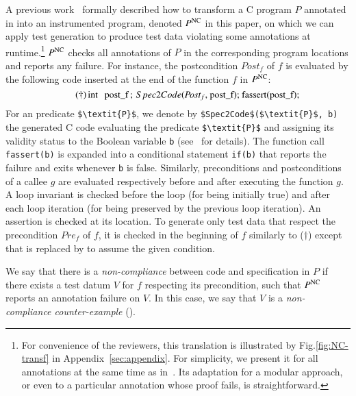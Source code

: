 A previous work~\cite{Petiot/SCAM14} formally described 
how to transform a C program $P$ annotated in \eacsl
into an instrumented program, denoted  $P^\mathrm{NC}$ in this paper,
on which we can apply test generation to produce test data
violating some annotations at runtime.\footnote{For convenience of the reviewers, 
this translation 
is illustrated by Fig.\ref{fig:NC-transf} in Appendix~\ref{sec:appendix}.
For simplicity, we present it for all annotations at the same time as in~\cite{Petiot/SCAM14}.
Its adaptation for a modular approach, or even to a particular annotation whose proof fails,
is straightforward.}
$P^\mathrm{NC}$ checks all annotations of $P$
in the corresponding program locations
and reports any failure.
For instance, the postcondition $\textit{Post}_f$ of $f$
is evaluated by the following code inserted at the end of the function $f$ in $P^\mathrm{NC}$:
\begin{equation}\tag{$\dagger$}
\mbox{\lstinline[mathescape]'int post_f;  $\ Spec2Code$($\textit{Post}_f$, post_f); fassert(post_f);'}
\end{equation}
For an \eacsl predicate \lstinline[mathescape]'$\textit{P}$',
we denote by \lstinline[mathescape]'$Spec2Code$($\textit{P}$, b)'
the generated C code  evaluating the predicate
\lstinline[mathescape]'$\textit{P}$'
and assigning its validity status to the Boolean 
variable \lstinline[mathescape]'b' (see~\cite{Petiot/SCAM14} for details).
The function call \lstinline[mathescape]'fassert(b)'
is expanded into a conditional
statement \lstinline[mathescape]'if(b)' that reports the failure and exits 
whenever \lstinline[mathescape]'b' is false.
Similarly, preconditions and postconditions of a callee $g$
are evaluated respectively before and after executing the function $g$.
A loop invariant is checked before the loop (for being initially true) 
and after each loop iteration (for being preserved by the previous
loop iteration). 
An assertion is checked at its location.
To generate only test data  that respect
the precondition $\textit{Pre}_f$ of $f$,
it is checked  in the beginning of $f$ 
similarly to ($\dagger$)
except that \fassert
is replaced by \fassume
to assume the given condition.

\vspace{-2mm}
\begin{definition} 
\label{def:NC}
We say that there is a \emph{non-compliance} between code and specification in $P$
if there exists  a test datum $V$ for $f$ respecting its precondition,
such that $P^{\mathrm{NC}}$ reports an annotation failure on $V$.
In this case, we say that $V$ is a \emph{non-compliance counter-example} (\NCCE).
\end{definition}
\vspace{-2mm}

